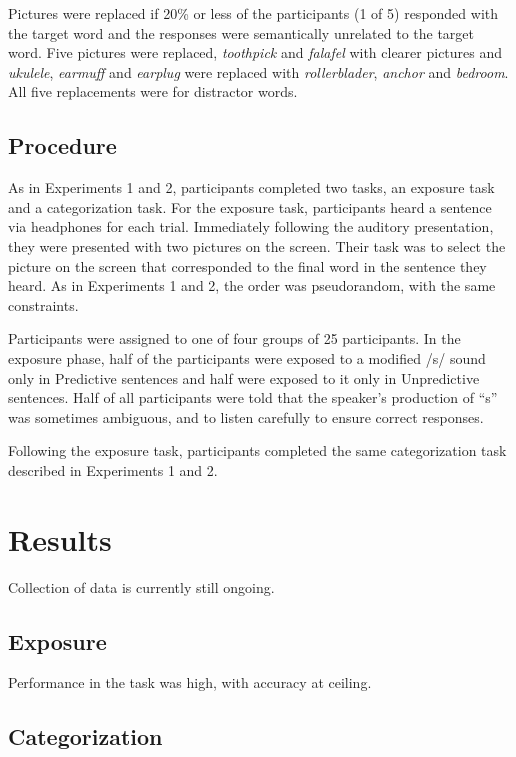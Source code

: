 Pictures were replaced if 20\% or less of the participants (1 of 5) responded with the target word and the responses were semantically unrelated to the target word. 
Five pictures were replaced, \emph{toothpick} and \emph{falafel} with clearer pictures and \emph{ukulele}, \emph{earmuff} and \emph{earplug} were replaced with \emph{rollerblader}, \emph{anchor} and \emph{bedroom}.  
All five replacements were for distractor words.

\subsection{Procedure}

As in Experiments 1 and 2, participants completed two tasks, an exposure task and a categorization task.  For the exposure task, participants heard a sentence via headphones for each trial.  Immediately following the auditory presentation, they were presented with two pictures on the screen.  Their task was to select the picture on the screen that corresponded to the final word in the sentence they heard.  As in Experiments 1 and 2, the order was pseudorandom, with the same constraints.

Participants were assigned to one of four groups of 25 participants.  
In the exposure phase, half of the participants were exposed to a modified /s/ sound only in Predictive sentences and half were exposed to it only in Unpredictive sentences.  
Half of all participants were told that the speaker's production of ``s'' was sometimes ambiguous, and to listen carefully to ensure correct responses.  

Following the exposure task, participants completed the same categorization task described in Experiments 1 and 2.

\section{Results}

Collection of data is currently still ongoing.

\subsection{Exposure}

Performance in the task was high, with accuracy at ceiling.

\subsection{Categorization}


